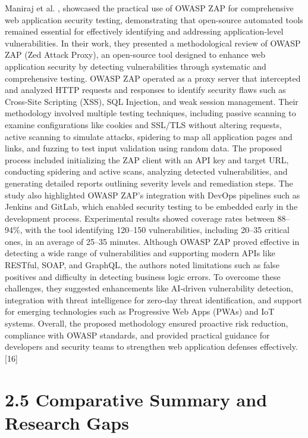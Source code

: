 \documentclass[12pt,a4paper]{report}
\begin{document}
Maniraj et al. , showcased the practical use of OWASP ZAP for comprehensive web application security testing, demonstrating that open-source automated tools remained essential for effectively identifying and addressing application-level vulnerabilities. In their work, they presented a methodological review of OWASP ZAP (Zed Attack Proxy), an open-source tool designed to enhance web application security by detecting vulnerabilities through systematic and comprehensive testing. OWASP ZAP operated as a proxy server that intercepted and analyzed HTTP requests and responses to identify security flaws such as Cross-Site Scripting (XSS), SQL Injection, and weak session management. Their methodology involved multiple testing techniques, including passive scanning to examine configurations like cookies and SSL/TLS without altering requests, active scanning to simulate attacks, spidering to map all application pages and links, and fuzzing to test input validation using random data. The proposed process included initializing the ZAP client with an API key and target URL, conducting spidering and active scans, analyzing detected vulnerabilities, and generating detailed reports outlining severity levels and remediation steps. The study also highlighted OWASP ZAP’s integration with DevOps pipelines such as Jenkins and GitLab, which enabled security testing to be embedded early in the development process. Experimental results showed coverage rates between 88–94\%, with the tool identifying 120–150 vulnerabilities, including 20–35 critical ones, in an average of 25–35 minutes. Although OWASP ZAP proved effective in detecting a wide range of vulnerabilities and supporting modern APIs like RESTful, SOAP, and GraphQL, the authors noted limitations such as false positives and difficulty in detecting business logic errors. To overcome these challenges, they suggested enhancements like AI-driven vulnerability detection, integration with threat intelligence for zero-day threat identification, and support for emerging technologies such as Progressive Web Apps (PWAs) and IoT systems. Overall, the proposed methodology ensured proactive risk reduction, compliance with OWASP standards, and provided practical guidance for developers and security teams to strengthen web application defenses effectively. [16]

\section{2.5 Comparative Summary and Research Gaps}
\end{document}
